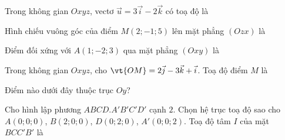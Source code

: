 \luyentap
{}
\begin{bai}Trong không gian $Oxyz$, vectơ $\vec u=3\vec i-2\vec k$ có toạ độ là
\end{bai}
\begin{bai}Hình chiếu vuông góc của điểm $M(2;-1;5)$ lên mặt phẳng $(Ozx)$ là
\end{bai}
\begin{bai}Điểm đối xứng với $A(1;-2;3)$ qua mặt phẳng $(Oxy)$ là
\end{bai}
\begin{bai}Trong không gian $Oxyz$, cho $\vt{OM}=2\vec j-3\vec k+\vec i$. Toạ độ điểm $M$ là
\end{bai}
\begin{bai}Điểm nào dưới đây thuộc trục $Oy$?
\end{bai}
\begin{bai}Cho hình lập phương $ABCD.A'B'C'D'$ cạnh $2$. Chọn hệ trục toạ độ sao cho $A(0;0;0)$, $B(2;0;0)$, $D(0;2;0)$, $A'(0;0;2)$. Toạ độ tâm $I$ của mặt $BCC'B'$ là
\end{bai}

